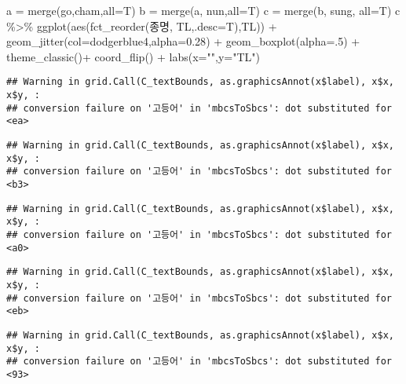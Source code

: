 \documentclass[
]{article}
\newenvironment{Shaded}{\begin{snugshade}}{\end{snugshade}}
\newcommand{\AttributeTok}[1]{\textcolor[rgb]{0.77,0.63,0.00}{#1}}
\newcommand{\DecValTok}[1]{\textcolor[rgb]{0.00,0.00,0.81}{#1}}
\newcommand{\FloatTok}[1]{\textcolor[rgb]{0.00,0.00,0.81}{#1}}
\newcommand{\FunctionTok}[1]{\textcolor[rgb]{0.00,0.00,0.00}{#1}}
\newcommand{\NormalTok}[1]{#1}
\newcommand{\OtherTok}[1]{\textcolor[rgb]{0.56,0.35,0.01}{#1}}
\newcommand{\SpecialCharTok}[1]{\textcolor[rgb]{0.00,0.00,0.00}{#1}}
\newcommand{\StringTok}[1]{\textcolor[rgb]{0.31,0.60,0.02}{#1}}
\begin{document}
\begin{Shaded}
\begin{Highlighting}[]
\NormalTok{a }\OtherTok{=} \FunctionTok{merge}\NormalTok{(go,cham,}\AttributeTok{all=}\NormalTok{T)}
\NormalTok{b }\OtherTok{=} \FunctionTok{merge}\NormalTok{(a, nun,}\AttributeTok{all=}\NormalTok{T)}
\NormalTok{c }\OtherTok{=} \FunctionTok{merge}\NormalTok{(b, sung, }\AttributeTok{all=}\NormalTok{T)}
\NormalTok{c }\SpecialCharTok{\%\textgreater{}\%} \FunctionTok{ggplot}\NormalTok{(}\FunctionTok{aes}\NormalTok{(}\FunctionTok{fct\_reorder}\NormalTok{(종명, TL,}\AttributeTok{.desc=}\NormalTok{T),TL)) }\SpecialCharTok{+} \FunctionTok{geom\_jitter}\NormalTok{(}\AttributeTok{col=}\StringTok{\textquotesingle{}dodgerblue4\textquotesingle{}}\NormalTok{,}\AttributeTok{alpha=}\FloatTok{0.28}\NormalTok{) }\SpecialCharTok{+} \FunctionTok{geom\_boxplot}\NormalTok{(}\AttributeTok{alpha=}\NormalTok{.}\DecValTok{5}\NormalTok{) }\SpecialCharTok{+} \FunctionTok{theme\_classic}\NormalTok{()}\SpecialCharTok{+} \FunctionTok{coord\_flip}\NormalTok{() }\SpecialCharTok{+} \FunctionTok{labs}\NormalTok{(}\AttributeTok{x=}\StringTok{""}\NormalTok{,}\AttributeTok{y=}\StringTok{"TL"}\NormalTok{)}
\end{Highlighting}
\end{Shaded}

\begin{verbatim}
## Warning in grid.Call(C_textBounds, as.graphicsAnnot(x$label), x$x, x$y, :
## conversion failure on '고등어' in 'mbcsToSbcs': dot substituted for <ea>
\end{verbatim}

\begin{verbatim}
## Warning in grid.Call(C_textBounds, as.graphicsAnnot(x$label), x$x, x$y, :
## conversion failure on '고등어' in 'mbcsToSbcs': dot substituted for <b3>
\end{verbatim}

\begin{verbatim}
## Warning in grid.Call(C_textBounds, as.graphicsAnnot(x$label), x$x, x$y, :
## conversion failure on '고등어' in 'mbcsToSbcs': dot substituted for <a0>
\end{verbatim}

\begin{verbatim}
## Warning in grid.Call(C_textBounds, as.graphicsAnnot(x$label), x$x, x$y, :
## conversion failure on '고등어' in 'mbcsToSbcs': dot substituted for <eb>
\end{verbatim}

\begin{verbatim}
## Warning in grid.Call(C_textBounds, as.graphicsAnnot(x$label), x$x, x$y, :
## conversion failure on '고등어' in 'mbcsToSbcs': dot substituted for <93>
\end{verbatim}
\end{document}
